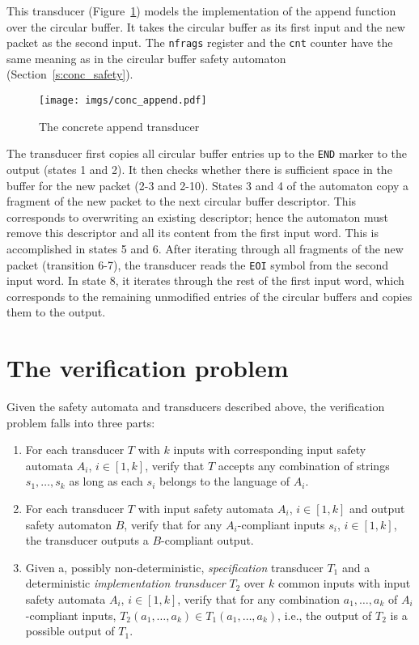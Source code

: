 \documentclass{article}
\begin{document}
This transducer (Figure~\ref{f:conc_append}) models the 
implementation of the append function over the circular buffer.  
It takes the circular buffer as its first input and the new packet 
as the second input.  The \texttt{nfrags} register and the 
\texttt{cnt} counter have the same meaning as in the circular 
buffer safety automaton (Section~\ref{s:conc_safety}).

\begin{figure}[t]
    \center
    \texttt{[image: imgs/conc\_append.pdf]}
    \caption{The concrete append transducer}\label{f:conc_append}
\end{figure}

The transducer first copies all circular buffer entries up to the 
\texttt{END} marker to the output (states 1 and 2).  It then 
checks whether there is sufficient space in the buffer for the new 
packet (2-3 and 2-10).  States 3 and 4 of the automaton copy a 
fragment of the new packet to the next circular buffer descriptor.  
This corresponds to overwriting an existing descriptor; hence the 
automaton must remove this descriptor and all its content from the 
first input word.  This is accomplished in states 5 and 6.  After 
iterating through all fragments of the new packet (transition 
6-7), the transducer reads the \texttt{EOI} symbol from the second 
input word.  In state 8, it iterates through the rest of the first 
input word, which corresponds to the remaining unmodified entries 
of the circular buffers and copies them to the output.  

\section{The verification problem}

Given the safety automata and transducers described above, the 
verification problem falls into three parts:

\begin{enumerate}
    \item For each transducer $T$ with $k$ inputs with 
        corresponding input safety automata $A_i$, $i\in [1,k]$, 
        verify that $T$ accepts any combination of strings 
        $s_1,\ldots,s_k$ as long as each $s_i$ belongs to the 
        language of $A_i$.

    \item For each transducer $T$ with input safety automata 
        $A_i$, $i\in [1,k]$ and output safety automaton $B$, 
        verify that for any $A_i$-compliant inputs $s_i$, 
        $i\in[1,k]$, the transducer outputs a $B$-compliant 
        output.

    \item Given a, possibly non-deterministic, 
        \emph{specification} transducer $T_1$ and a deterministic 
        \emph{implementation transducer} $T_2$ over $k$ common 
        inputs with input safety automata $A_i$, $i \in [1,k]$, 
        verify that for any combination $a_1,\ldots,a_k$ of 
        $A_i$-compliant inputs, $T_2(a_1,\ldots, a_k)\in 
        T_1(a_1,\ldots,a_k)$, i.e., the output of $T_2$ is a 
        possible output of $T_1$.
\end{enumerate}
\end{document}
